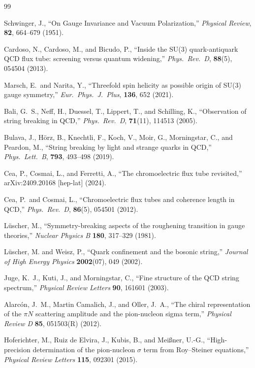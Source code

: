 ﻿\documentclass[12pt,letterpaper]{article}
\begin{document}
\begin{thebibliography}{99}

Schwinger, J.,
``On Gauge Invariance and Vacuum Polarization,''
\textit{Physical Review}, \textbf{82}, 664--679 (1951).


Cardoso, N., Cardoso, M., and Bicudo, P.,
``Inside the SU(3) quark-antiquark QCD flux tube: screening versus quantum widening,''
\textit{Phys.\ Rev.\ D}, \textbf{88}(5), 054504 (2013).


Marsch, E.\ and Narita, Y.,
``Threefold spin helicity as possible origin of SU(3) gauge symmetry,''
\textit{Eur.\ Phys.\ J.\ Plus}, \textbf{136}, 652 (2021).


Bali, G.~S., Neff, H., Duessel, T., Lippert, T., and Schilling, K.,
``Observation of string breaking in QCD,''
\textit{Phys.\ Rev.\ D}, \textbf{71}(11), 114513 (2005).


Bulava, J., H\"orz, B., Knechtli, F., Koch, V., Moir, G., Morningstar, C., and Peardon, M.,
``String breaking by light and strange quarks in QCD,''
\textit{Phys.\ Lett.\ B}, \textbf{793}, 493--498 (2019).


Cea, P., Cosmai, L., and Ferretti, A.,
``The chromoelectric flux tube revisited,''
arXiv:2409.20168 [hep-lat] (2024).


Cea, P.\ and Cosmai, L.,
``Chromoelectric flux tubes and coherence length in QCD,''
\textit{Phys.\ Rev.\ D}, \textbf{86}(5), 054501 (2012).



L\"uscher, M.,
``Symmetry-breaking aspects of the roughening transition in gauge theories,''
\textit{Nuclear Physics B} \textbf{180}, 317--329 (1981).


L\"uscher, M. and Weisz, P.,
``Quark confinement and the bosonic string,''
\textit{Journal of High Energy Physics} \textbf{2002}(07), 049 (2002).


Juge, K.~J., Kuti, J., and Morningstar, C.,
``Fine structure of the QCD string spectrum,''
\textit{Physical Review Letters} \textbf{90}, 161601 (2003).


Alarcón, J.~M., Martin Camalich, J., and Oller, J.~A.,
``The chiral representation of the $\pi N$ scattering amplitude and the pion-nucleon sigma term,''
\textit{Physical Review D} \textbf{85}, 051503(R) (2012).


Hoferichter, M., Ruiz de Elvira, J., Kubis, B., and Meißner, U.-G.,
``High-precision determination of the pion-nucleon $\sigma$ term from Roy--Steiner equations,''
\textit{Physical Review Letters} \textbf{115}, 092301 (2015).





\end{thebibliography}
\end{document}
